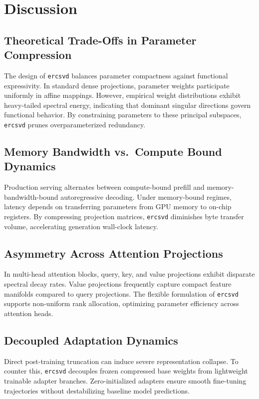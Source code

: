 \section{Discussion}

\subsection{Theoretical Trade-Offs in Parameter Compression}
The design of \texttt{ercsvd} balances parameter compactness against functional expressivity. In standard dense projections, parameter weights participate uniformly in affine mappings. However, empirical weight distributions exhibit heavy-tailed spectral energy, indicating that dominant singular directions govern functional behavior. By constraining parameters to these principal subspaces, \texttt{ercsvd} prunes overparameterized redundancy.

\subsection{Memory Bandwidth vs.\ Compute Bound Dynamics}
Production serving alternates between compute-bound prefill and memory-bandwidth-bound autoregressive decoding. Under memory-bound regimes, latency depends on transferring parameters from GPU memory to on-chip registers. By compressing projection matrices, \texttt{ercsvd} diminishes byte transfer volume, accelerating generation wall-clock latency.

\subsection{Asymmetry Across Attention Projections}
In multi-head attention blocks, query, key, and value projections exhibit disparate spectral decay rates. Value projections frequently capture compact feature manifolds compared to query projections. The flexible formulation of \texttt{ercsvd} supports non-uniform rank allocation, optimizing parameter efficiency across attention heads.

\subsection{Decoupled Adaptation Dynamics}
Direct post-training truncation can induce severe representation collapse. To counter this, \texttt{ercsvd} decouples frozen compressed base weights from lightweight trainable adapter branches. Zero-initialized adapters ensure smooth fine-tuning trajectories without destabilizing baseline model predictions.

